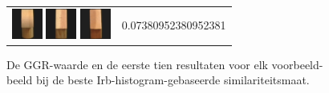 \begin{figure}[tbp]
\begin{center}
\begin{tabular}{m{11cm} | m{3cm} |}
\includegraphics[width=1cm]{coil/beeld-2.eps}
\includegraphics[width=1cm]{coil/beeld-47.eps}
\includegraphics[width=1cm]{coil/beeld-44.eps}
& {\scriptsize 0.07380952380952381}
\end{tabular}
\caption{\label{fig:results_irb_histgeb}De GGR-waarde en de eerste tien resultaten voor elk voorbeeld-beeld bij de beste Irb-histogram-gebaseerde similariteitsmaat.}
\end{center}
\end{figure}

